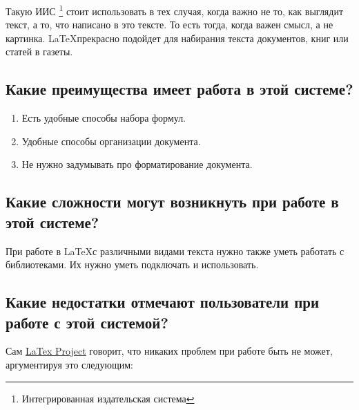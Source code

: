 \documentclass[a4paper,12pt]{article}
\begin{document}
Такую ИИС
\footnote{Интегрированная издательская система}
стоит использовать в тех случая, когда важно не то, как выглядит текст, а то, что написано в это тексте.
То есть тогда, когда важен смысл, а не картинка.
\LaTeX прекрасно подойдет для набирания текста документов, книг или статей в газеты.

\subsection*{Какие преимущества имеет работа в этой системе?}

\begin{enumerate}
    \item Есть удобные способы набора \huge формул. \normalsize
    \item Удобные способы организации документа.
    \item \tiny Не \normalsize нужно задумывать про форматирование документа.
\end{enumerate}

\subsection*{Какие сложности могут возникнуть при работе в этой системе?}

\begin{flushleft}
При работе в \LaTeX с различными видами текста нужно также уметь работать с библиотеками.
Их нужно уметь подключать и использовать.
\end{flushleft}

\subsection*{Какие недостатки отмечают пользователи при работе с этой системой?}

Сам
\href{https://www.latex-project.org/}{\underline{LaTex Project}}
говорит, что никаких проблем при работе быть не может, аргументируя это следующим:\\
\end{document}
